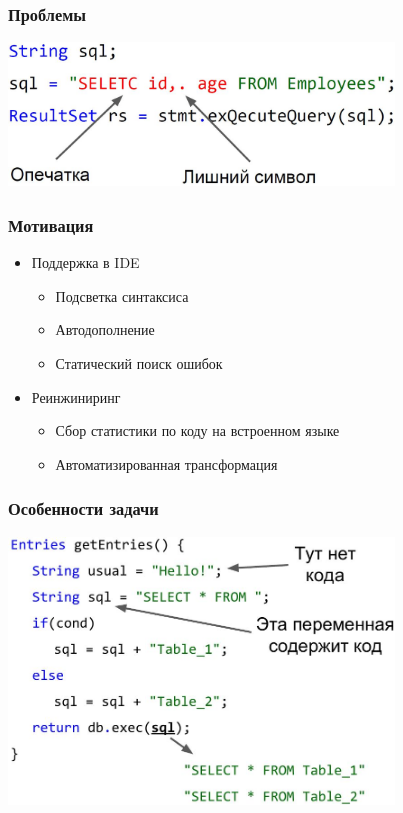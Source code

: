 \documentclass{beamer}
\begin{document}
\begin{frame}[fragile]
	\transwipe[direction=90]
	\frametitle{Проблемы}
	\begin{center}
            \includegraphics[width=290pt]{pictures/problems.jpg}
        \end{center}
\end{frame}

\begin{frame}[fragile]
	\transwipe[direction=90]
	\frametitle{Мотивация}
	\begin{itemize}
	    \item Поддержка в IDE 
		\begin{itemize}
			\item Подсветка синтаксиса
			\item Автодополнение
			\item Статический поиск ошибок
		\end{itemize}
	    \item Реинжиниринг
		\begin{itemize}
			\item Сбор статистики по коду на встроенном языке
			\item Автоматизированная трансформация 
		\end{itemize}
    \end{itemize}
\end{frame}

\begin{frame}[fragile]
	\transwipe[direction=90]
	\frametitle{Особенности задачи}
	\begin{center}
            \includegraphics[width=290pt]{pictures/approximation_input.jpg}
        \end{center}
\end{frame}
\end{document}
